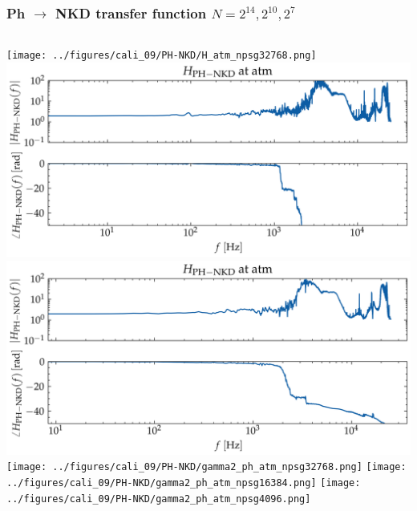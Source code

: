 \documentclass[aspectratio=169,10pt]{beamer}
\begin{document}
\begin{frame}
    \frametitle{Ph $\to$ NKD transfer function $N=2^{14}, 2^{10}, 2^{7}$}
    \begin{columns}[c] %
            \centering
            \texttt{[image: ../figures/cali\_09/PH-NKD/H\_atm\_npsg32768.png]}
            \includegraphics[width=0.6\linewidth]{../figures/cali_09/PH-NKD/H_atm_npsg16384.png}
            \includegraphics[width=0.6\linewidth]{../figures/cali_09/PH-NKD/H_atm_npsg4096.png}
            \centering
            \texttt{[image: ../figures/cali\_09/PH-NKD/gamma2\_ph\_atm\_npsg32768.png]}
            \texttt{[image: ../figures/cali\_09/PH-NKD/gamma2\_ph\_atm\_npsg16384.png]}
            \texttt{[image: ../figures/cali\_09/PH-NKD/gamma2\_ph\_atm\_npsg4096.png]}
    \end{columns}
\end{frame}

    
    

\end{document}
